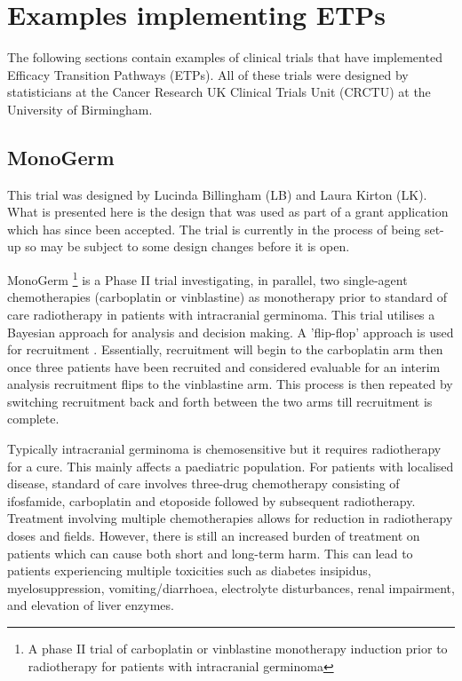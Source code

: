 
\chapter{Examples implementing ETPs} %

\label{AppendixETPexample} %

The following sections contain examples of clinical trials that have implemented Efficacy Transition Pathways (ETPs). All of these trials were designed by statisticians at the Cancer Research UK Clinical Trials Unit (CRCTU) at the University of Birmingham.


\section{MonoGerm} 

This trial was designed by Lucinda Billingham (LB) and Laura Kirton (LK). What is presented here is the design that was used as part of a grant application which has since been accepted. The trial is currently in the process of being set-up so may be subject to some design changes before it is open. 

MonoGerm \footnote{A phase II trial of carboplatin or vinblastine monotherapy induction prior to radiotherapy for patients with intracranial germinoma} is a Phase \RN{2} trial investigating, in parallel, two single-agent chemotherapies (carboplatin or vinblastine) as monotherapy prior to standard of care radiotherapy in patients with intracranial germinoma. This trial utilises a Bayesian approach for analysis and decision making. A 'flip-flop' approach is used for recruitment \cite{harringtonGuidelinesPreclinicalEarly2011}. Essentially, recruitment will begin to the carboplatin arm then once three patients have been recruited and considered evaluable for an interim analysis recruitment flips to the vinblastine arm. This process is then repeated by switching recruitment back and forth between the two arms till recruitment is complete. 

Typically intracranial germinoma is chemosensitive but it requires radiotherapy for a cure. This mainly affects a paediatric population. For patients with localised disease, standard of care involves three-drug chemotherapy consisting of ifosfamide, carboplatin and etoposide followed by subsequent radiotherapy. Treatment involving multiple chemotherapies allows for reduction in radiotherapy doses and fields. However, there is still an increased burden of treatment on patients which can cause both short and long-term harm. This can lead to patients experiencing multiple toxicities such as diabetes insipidus, myelosuppression, vomiting/diarrhoea, electrolyte disturbances, renal impairment, and elevation of liver enzymes. 

